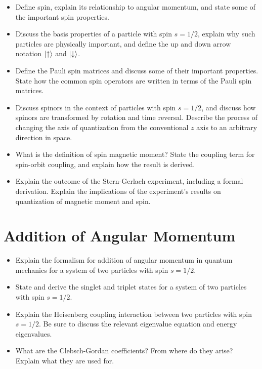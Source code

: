 \begin{itemize}

    \item Define spin, explain its relationship to angular momentum, and state some of the important spin properties.

    \item Discuss the basis properties of a particle with spin $ s = 1/2 $, explain why such particles are physically important, and define the up and down arrow notation $ \ket{\uparrow} $ and $ \ket{\downarrow} $.

    \item Define the Pauli spin matrices and discuss some of their important properties. State how the common spin operators are written in terms of the Pauli spin matrices.

    \item Discuss spinors in the context of particles with spin $ s = 1/2 $, and discuss how spinors are transformed by rotation and time reversal. Describe the process of changing the axis of quantization from the conventional $ z $ axis to an arbitrary direction in space.

    \item What is the definition of spin magnetic moment? State the coupling term for spin-orbit coupling, and explain how the result is derived.

    \item Explain the outcome of the Stern-Gerlach experiment, including a formal derivation. Explain the implications of the experiment's results on quantization of magnetic moment and spin.

\end{itemize}

\section{Addition of Angular Momentum}

\begin{itemize}

    \item Explain the formalism for addition of angular momentum in quantum mechanics for a system of two particles with spin $ s = 1/2 $.

    \item State and derive the singlet and triplet states for a system of two particles with spin $ s = 1/2 $.

    \item Explain the Heisenberg coupling interaction between two particles with spin $ s = 1/2 $. Be sure to discuss the relevant eigenvalue equation and energy eigenvalues.

    \item What are the Clebsch-Gordan coefficients? From where do they arise? Explain what they are used for.

\end{itemize}

